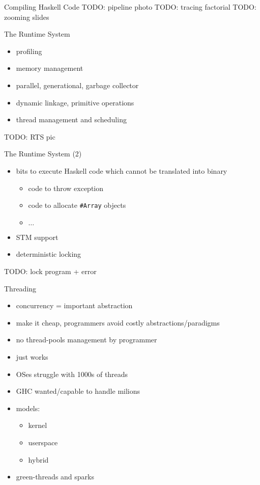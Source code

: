 \documentclass{beamer}
\begin{document}
\begin{frame}{Compiling Haskell Code}
  TODO: pipeline photo
  TODO: tracing factorial
  TODO: zooming slides
\end{frame}

\begin{frame}{The Runtime System}
  \begin{itemize}
    \item profiling
    \item memory management
    \item parallel, generational, garbage collector
    \item dynamic linkage, primitive operations
    \item thread management and scheduling
  \end{itemize}
  TODO: RTS pic
\end{frame}

\begin{frame}{The Runtime System (2)}
  \begin{itemize}
    \item bits to execute Haskell code which cannot be translated into binary
    \begin{itemize}
      \item code to throw exception
      \item code to allocate \texttt{\#Array} objects
      \item $\ldots$
    \end{itemize}
    \item STM support
    \item deterministic locking
  \end{itemize}
  TODO: lock program + error
\end{frame}

\begin{frame}{Threading}
  \begin{itemize}
    \item concurrency = important abstraction
    \item make it cheap, programmers avoid costly abstractions/paradigms
    \item no thread-pools management by programmer
    \item just works
    \pause
    \item OSes struggle with 1000s of threads
    \item GHC wanted/capable to handle milions
    \pause
    \item models:
    \begin{itemize}
      \item kernel
      \item userspace
      \item hybrid
    \end{itemize}
    \pause
    \item green-threads and sparks
  \end{itemize}
\end{frame}
\end{document}
